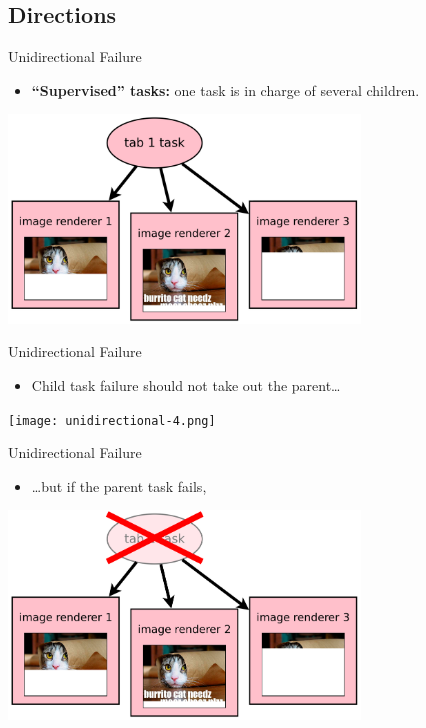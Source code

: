 \documentclass[xcolor=dvipsnames]{beamer}
\begin{document}
\subsection{Directions}
\begin{frame}{Unidirectional Failure}
	\begin{itemize}
		\item {\bf ``Supervised'' tasks:} one task is in charge of several children.
	\end{itemize}
	\begin{center}
	\includegraphics[width=0.7\textwidth]{unidirectional.png}
	\end{center}
\end{frame}
\begin{frame}{Unidirectional Failure}
	\begin{itemize}
		\item Child task failure should not take out the parent\dots
	\end{itemize}
	\begin{center}
	\texttt{[image: unidirectional-4.png]}
	\end{center}
\end{frame}
\begin{frame}{Unidirectional Failure}
	\begin{itemize}
		\item \dots but if the parent task fails,
	\end{itemize}
	\begin{center}
	\includegraphics[width=0.7\textwidth]{unidirectional-2.png}
	\end{center}
\end{frame}
\end{document}

